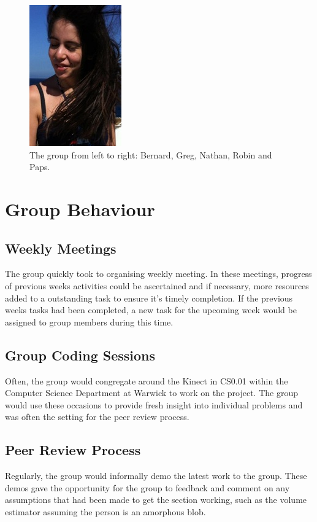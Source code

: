 \begin{figure}[h]
\begin{center}
\includegraphics[scale=0.5]{./pm/stef} 
\end{center}
\caption{The group from left to right: Bernard, Greg, Nathan, Robin and Paps.}
\label{fig:the group}
\end{figure}

\section{Group Behaviour}

\subsection{Weekly Meetings}
The group quickly took to organising weekly meeting. In these meetings, progress of previous weeks activities could be ascertained and if necessary, more resources added to a outstanding task to ensure it's timely completion. If the previous weeks tasks had been completed, a new task for the upcoming week would be assigned to group members during this time.\\

\subsection{Group Coding Sessions}
Often, the group would congregate around the Kinect in CS0.01 within the Computer Science Department at Warwick to work on the project. The group would use these occasions to provide fresh insight into individual problems and was often the setting for the peer review process.\\

\subsection{Peer Review Process}
\label{pm:peer review process}
Regularly, the group would informally demo the latest work to the group.
These demos gave the opportunity for the group to feedback and comment on any assumptions that had been made to get the section working, such as the volume estimator assuming the person is an amorphous blob.\\

